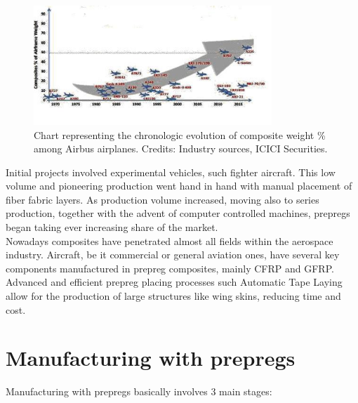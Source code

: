 \begin{figure}[h]
	\centering
	\includegraphics[width=0.8\textwidth]{img/weight_evolution.jpg}
	\caption[Time evolution in Airbus composite percentage weight]{Chart representing the chronologic evolution of composite weight \% among Airbus airplanes. Credits: Industry sources, ICICI Securities. \cite{weight_evolution}}
	\label{fig:weight_evolution}
\end{figure}

Initial projects involved experimental vehicles, such fighter aircraft. This low
volume and pioneering production went hand in hand with manual placement of fiber
fabric layers. As production volume increased, moving also to series production,
together with the advent of computer controlled machines, prepregs began taking
ever increasing share of the market.\\

Nowadays composites have penetrated almost all fields within the aerospace industry.
Aircraft, be it commercial or general aviation ones, have several key components
manufactured in prepreg composites, mainly CFRP and GFRP. Advanced and efficient
prepreg placing processes such Automatic Tape Laying allow for the production
of large structures like wing skins, reducing time and cost.\\

\section{Manufacturing with prepregs}


Manufacturing with prepregs basically involves 3 main stages:

